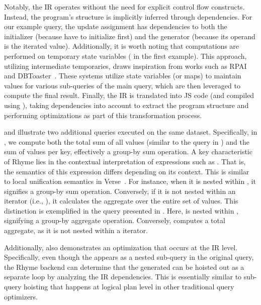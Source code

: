 \documentclass[runningheads]{llncs}
\newcommand{\lang}{Rhyme}
\begin{document}
Notably, the IR operates without the need for explicit control flow constructs.
Instead, the program's structure is implicitly inferred through dependencies.
For our example query, the update assignment  has dependencies to
both the initializer (because have to initialize first) and the generator
(because its operand is the iterated value).
Additionally, it is worth noting that computations are performed on temporary
state variables ( in the first example).
This approach, utilizing intermediate temporaries, draws inspiration from works
such as RPAI~\cite{rpai} and DBToaster~\cite{dbtoaster_vldb}.
These systems utilize state variables (or maps) to maintain values for
various sub-queries of the main query, which are then leveraged to compute the
final result.
Finally, the IR is translated into JS code (and compiled using ),
taking dependencies into account to extract the program structure and performing
optimizations as part of this transformation process.

 and  illustrate two additional queries executed on
the same dataset.
Specifically, in , we compute both the total sum of all values
(similar to the query in ) and the sum of values per key, effectively
a group-by sum operation.
A key characteristic of \lang{} lies in the contextual interpretation of expressions
such as .
That is, the semantics of this expression differs depending on its context.
This is similar to local unification semantics in Verse~\cite{verse}.
For instance, when it is nested within ,
it signifies a group-by sum operation.
Conversely, if it is not nested within an iterator (i.e., \inline{*}),
it calculates the aggregate over the entire set of values.
This distinction is exemplified in the query presented in .
Here,  is nested within , signifying a
group-by aggregate operation.
Conversely,  computes a total aggregate, as it is not nested
within a  iterator.

Additionally,  also demonstrates an optimization that occurs at the IR level.
Specifically, even though the  appears as a nested sub-query
in the original query, the \lang{} backend can determine that the generated
 can be hoisted out as a separate loop by analyzing the IR dependencies.
This is essentially similar to sub-query hoisting that happens at logical plan level
in other traditional query optimizers.
\end{document}
